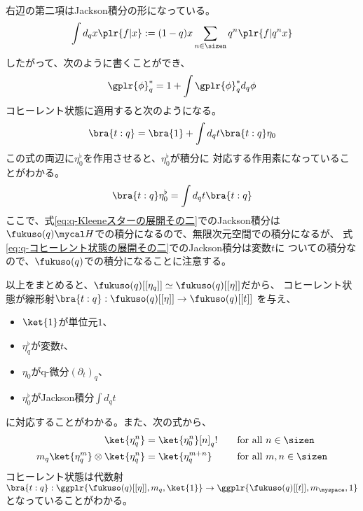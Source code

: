 {\begin{equation}
\begin{split}
	\end{split}\end{equation}
	右辺の第二項はJackson積分の形になっている。
	\begin{equation}\label{eq:Jackson積分の定義}\begin{split}
		\int d_qx\plr{f|x} := (1 - q)x\sum_{n\in\sizen} q^n\plr{f|q^nx}
	\end{split}\end{equation}
	したがって、次のように書くことができ、
	\begin{equation}\label{eq:q-Kleeneスターの展開その二}\begin{split}
		\gplr{\phi}_q^* = 1 + \int \gplr{\phi}_q^*d_q\phi
	\end{split}\end{equation}
	コヒーレント状態に適用すると次のようになる。
	\begin{equation}\label{eq:q-コヒーレント状態の展開その二}\begin{split}
		\bra{t:q} = \bra{1} + \int d_qt \bra{t:q}\eta_0 \\
	\end{split}\end{equation}
	この式の両辺に$\eta_0^\flat$を作用させると、$\eta_0^\flat$が積分に
	対応する作用素になっていることがわかる。
	\begin{equation*}\begin{split}
		\bra{t:q}\eta_0^\flat = \int d_qt\bra{t:q}
	\end{split}\end{equation*}
	ここで、式\eqref{eq:q-Kleeneスターの展開その二}でのJackson積分は
	$\fukuso(q)\Eta$での積分になるので、無限次元空間での積分になるが、
	式\eqref{eq:q-コヒーレント状態の展開その二}でのJackson積分は変数$t$に
	ついての積分なので、$\fukuso(q)$での積分になることに注意する。

	以上をまとめると、$\fukuso(q)[[\eta_q]]\simeq\fukuso(q)[[\eta]]$だから、
	コヒーレント状態が線形射$\bra{t:q}:\fukuso(q)[[\eta]]\to\fukuso(q)[[t]]$
	を与え、
	\begin{itemize}\setlength{\itemsep}{-1mm} %
		\item $\ket{1}$が単位元$1$、
		\item $\eta_q^\flat$が変数$t$、
		\item $\eta_0$がq-微分$(\partial_t)_q$、
		\item $\eta_0^\flat$がJackson積分$\int d_qt$
	\end{itemize} %
	に対応することがわかる。また、次の式から、
	\begin{alignat*}{2}
		\ket{\eta_q^n} &= \ket{\eta_0^n}[n]_q!
		&\quad&\text{for all } n\in\sizen \\
		m_q\ket{\eta_q^m}\otimes\ket{\eta_q^n} &= \ket{\eta_q^{m+n}} 
		&\quad&\text{for all } m,n\in\sizen
	\end{alignat*}
	コヒーレント状態は代数射
	$\bra{t:q}:\ggplr{\fukuso(q)[[\eta]],m_q,\ket{1}}
	\to\ggplr{\fukuso(q)[[t]],m_\myspace,1}$
	となっていることがわかる。
}
